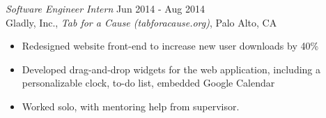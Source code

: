 {\sl Software Engineer Intern} \hfill Jun 2014 - Aug 2014 \\
Gladly, Inc., \textit{Tab for a Cause (tabforacause.org)}, Palo Alto, CA
\begin{itemize} \itemsep -2pt %
\item Redesigned website front-end to increase new user downloads by 40\%
\item Developed drag-and-drop widgets for the web application, including a \\ personalizable clock, to-do list, embedded Google Calendar
\item Worked solo, with mentoring help from supervisor.
\end{itemize}
